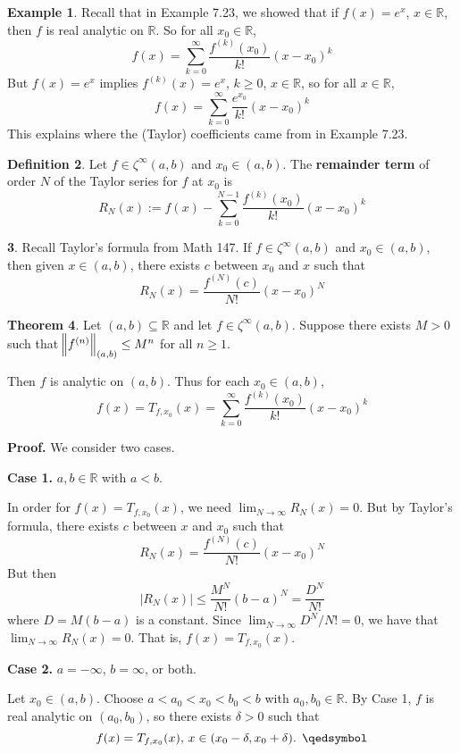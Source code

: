 \documentclass[11pt]{article}
\theoremstyle{definition}
\newtheorem{thm}{Theorem}[section]
\newtheorem{defn}[thm]{Definition}
\newtheorem{exmp}[thm]{Example}
\newtheorem{none}[thm]{}
\newcommand{\mbR}{\ensuremath{\mathbb{R}}}
\begin{document}
\begin{exmp}
Recall that in Example 7.23, we showed that if $f(x) = e^x$, $x \in \mbR$, then $f$ is real analytic on $\mbR$. So for all $x_0 \in \mbR$,
$$f(x) = \sum_{k=0}^\infty \frac{f^{(k)}(x_0)}{k!} (x - x_0)^k$$
But $f(x) = e^x$ implies $f^{(k)}(x) = e^x$, $k \geq 0$, $x \in \mbR$, so for all $x \in \mbR$,
$$f(x) = \sum_{k=0}^\infty \frac{e^{x_0}}{k!} (x - x_0)^k$$
This explains where the (Taylor) coefficients came from in Example 7.23.
\end{exmp}

\begin{defn}
Let $f \in \zeta^\infty(a, b)$ and $x_0 \in (a, b)$. The \textbf{remainder term} of order $N$ of the Taylor series for $f$ at $x_0$ is
$$R_N(x) := f(x) - \sum_{k=0}^{N-1} \frac{f^{(k)}(x_0)}{k!} (x - x_0)^k$$
\end{defn}

\begin{none}
Recall Taylor's formula from {\sc Math 147.} If $f \in \zeta^\infty (a, b)$ and $x_0 \in (a, b)$, then given $x \in (a, b)$, there exists $c$ between $x_0$ and $x$ such that
$$R_N(x) = \frac{f^{(N)}(c)}{N!} (x - x_0)^N$$
\end{none}

\begin{thm}
Let $(a, b) \subseteq \mbR$ and let $f \in \zeta^\infty (a, b)$. Suppose there exists $M > 0$ such that $\norm{f^{(n)}}_{(a, b)} \leq M^n$ for all $n \geq 1$.

Then $f$ is analytic on $(a, b)$. Thus for each $x_0 \in (a, b)$,
$$f(x) = T_{f, x_0}(x) = \sum_{k=0}^\infty \frac{f^{(k)}(x_0)}{k!} (x - x_0)^k$$
\end{thm}
\textbf{Proof.} We consider two cases.

\textbf{Case 1.} $a, b \in \mbR$ with $a < b$. 

In order for $f(x) = T_{f, x_0}(x)$, we need $\lim_{N\to\infty} R_N(x) = 0$. But by Taylor's formula, there exists $c$ between $x$ and $x_0$ such that
$$R_N(x) = \frac{f^{(N)}(c)}{N!} (x - x_0)^N$$
But then
$$|R_N(x)| \leq \frac{M^N}{N!} (b-a)^N = \frac{D^N}{N!}$$
where $D = M(b-a)$ is a constant. Since $\lim_{N\to\infty} D^N / N! = 0$, we have that $\lim_{N\to\infty} R_N(x) = 0$. That is, $f(x) = T_{f, x_0}(x)$. 

\textbf{Case 2.} $a = -\infty$, $b = \infty$, or both. 

Let $x_0 \in (a, b)$. Choose $a < a_0 < x_0 < b_0 < b$ with $a_0, b_0 \in \mbR$. By Case 1, $f$ is real analytic on $(a_0, b_0)$, so there exists $\delta > 0$ such that
$$f(x) = T_{f, x_0}(x), \, x \in (x_0 - \delta, x_0 + \delta) \text{. } \qedsymbol$$
\end{document}

